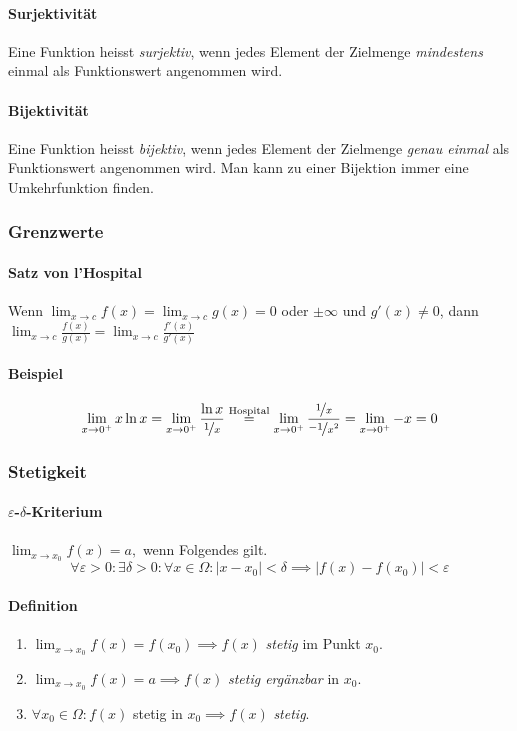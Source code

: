 \documentclass[a4paper, 9pt, DIV=24]{scrartcl}
\begin{document}
\paragraph{Surjektivität}
Eine Funktion heisst \emph{surjektiv}, wenn jedes Element der Zielmenge \emph{mindestens} einmal als Funktionswert angenommen wird.

\paragraph{Bijektivität}
Eine Funktion heisst \emph{bijektiv}, wenn jedes Element der Zielmenge \emph{genau einmal} als Funktionswert angenommen wird. Man kann zu einer Bijektion immer eine Umkehrfunktion finden.
\subsubsection{Grenzwerte}

\paragraph{Satz von l'Hospital}
Wenn $\lim_{x \to c}f(x) = \lim_{x \to c}g(x)= 0 $ oder $\pm\infty$ und $g'(x)\neq 0$, dann $\lim_{x\to c}\frac{f(x)}{g(x)} = \lim_{x\to c}\frac{f'(x)}{g'(x)}$
\paragraph{Beispiel}
\[ \lim_{x\to 0^+} x \ln x =\lim_{x\to 0^+}{\frac{\ln x}{\nicefrac{1}{x}}} \overset{\text{Hospital}}{=}\lim_{x\to 0^+}{\frac{\nicefrac{1}{x}}{\nicefrac{-1}{x^2}}} =\lim_{x\to 0^+} -x= 0 \]

\subsubsection{Stetigkeit}
\paragraph{$\varepsilon$-$\delta$-Kriterium} $\lim_{x\to x_0} f(x) = a, $ wenn Folgendes gilt.
\[\forall\varepsilon>0:\exists\delta>0: \forall x \in \Omega: |x-x_0| < \delta \implies |f(x) - f(x_0)| < \varepsilon \]
\paragraph{Definition}
\begin{enumerate}[label={(}\arabic*{)}]
 \item $\lim_{x\to x_0} f(x) = f(x_0) \implies f(x)$ \emph{stetig} im Punkt $x_0$.
 \item $\lim_{x\to x_0} f(x) = a \implies f(x)$ \emph{stetig ergänzbar} in $x_0$.
 \item $\forall x_0\in\Omega: f(x) $ stetig in $x_0 \implies f(x)$ \emph{stetig}.
\end{enumerate}
 
\end{document}

